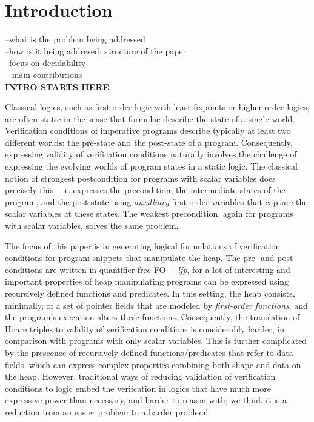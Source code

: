 \documentclass[acmsmall,review,anonymous]{acmart}\settopmatter{printfolios=true,printccs=false,printacmref=false}
\begin{document}
\section{Introduction}
\label{sec:minintro}

--what is the problem being addressed\\
--how is it being addresed: structure of the paper\\
--focus on decidability\\
-- main contributions\\
\textbf{INTRO STARTS HERE}

Classical logics, such as first-order logic with least fixpoints or higher order logics, are often static in the sense that formulae 
describe the state of a single world. 
Verification conditions of imperative programs describe typically at least two different worlds: the pre-state
and the post-state of a program. Consequently, expressing validity of verification conditions
naturally involves the challenge of expressing the evolving worlds of program states in a static logic.
The classical notion of strongest postcondition for programs with scalar variables does precisely this--- 
it expresses the precondition, the intermediate states of the program, and the post-state using \emph{auxilliary} 
first-order variables that capture the scalar variables at these states. The weakest precondition, again for
programs with scalar variables, solves the same problem.

The focus of this paper is in generating logical formulations of verification conditions for program snippets that manipulate the heap. The pre- and post-conditions are written in quantifier-free FO + \textit{lfp}, for a lot of interesting and important properties of heap manipulating programs can be expressed using recursively defined functions and predicates. In this setting, the heap consists, minimally, of a set of pointer fields that are modeled by \emph{first-order
functions}, and the program's execution alters these functions.
Consequently, the translation of Hoare triples to validity of verification conditions is considerably harder, in comparison with programs with only scalar variables. This is further complicated by the prescence of recursively defined functions/predicates that refer to data fields, which can express complex properties combining both shape and data on the heap.
However, traditional ways of reducing validation of verification conditions to logic embed the verifcation in logics that have much
more expressive power than necessary, and harder to reason with; we think it is a reduction from an easier problem to a harder problem!
\end{document}

